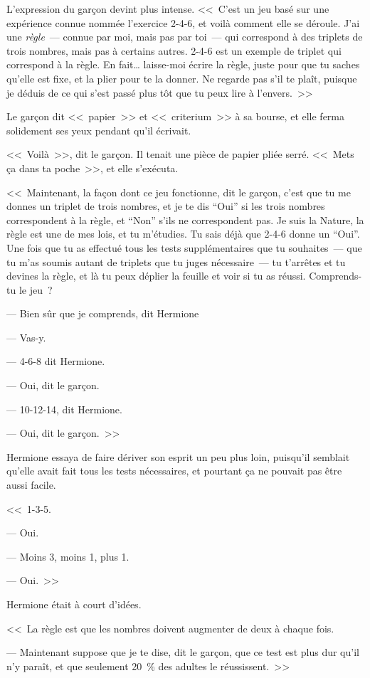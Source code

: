 L'expression du garçon devint plus intense. <<~C'est un jeu basé sur une expérience connue nommée l'exercice 2-4-6, et voilà comment elle se déroule. J'ai une \emph{règle}~— connue par moi, mais pas par toi~— qui correspond à des triplets de trois nombres, mais pas à certains autres. 2-4-6 est un exemple de triplet qui correspond à la règle. En fait… laisse-moi écrire la règle, juste pour que tu saches qu'elle est fixe, et la plier pour te la donner. Ne regarde pas s'il te plaît, puisque je déduis de ce qui s'est passé plus tôt que tu peux lire à l'envers.~>>

Le garçon dit <<~papier~>> et <<~criterium~>> à sa bourse, et elle ferma solidement ses yeux pendant qu'il écrivait.

<<~Voilà~>>, dit le garçon. Il tenait une pièce de papier pliée serré. <<~Mets ça dans ta poche~>>, et elle s'exécuta.

<<~Maintenant, la façon dont ce jeu fonctionne, dit le garçon, c'est que tu me donnes un triplet de trois nombres, et je te dis “Oui” si les trois nombres correspondent à la règle, et “Non” s'ils ne correspondent pas. Je suis la Nature, la règle est une de mes lois, et tu m'étudies. Tu sais déjà que 2-4-6 donne un “Oui”. Une fois que tu as effectué tous les tests supplémentaires que tu souhaites~— que tu m'as soumis autant de triplets que tu juges nécessaire~— tu t'arrêtes et tu devines la règle, et là tu peux déplier la feuille et voir si tu as réussi. Comprends-tu le jeu~?

--- Bien sûr que je comprends, dit Hermione

--- Vas-y.

--- 4-6-8 dit Hermione.

--- Oui, dit le garçon.

--- 10-12-14, dit Hermione.

--- Oui, dit le garçon.~>>

Hermione essaya de faire dériver son esprit un peu plus loin, puisqu'il semblait qu'elle avait fait tous les tests nécessaires, et pourtant ça ne pouvait pas être aussi facile.

<<~1-3-5.

--- Oui.

--- Moins 3, moins 1, plus 1.

--- Oui.~>>

Hermione était à court d'idées.

<<~La règle est que les nombres doivent augmenter de deux à chaque fois.

--- Maintenant suppose que je te dise, dit le garçon, que ce test est plus dur qu'il n'y paraît, et que seulement 20~\% des adultes le réussissent.~>>

